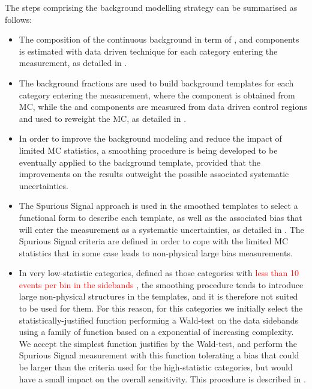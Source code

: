 The steps comprising the background modelling strategy can be summarised as follows:
\begin{itemize}

  \item The composition of the continuous background in term of \yy, \yjet and \jetjet components is estimated with data driven technique for each category entering the measurement, as detailed in \Sect{\ref{ssec:bkg_composition}}.
  \item The background fractions are used to build \myy background templates for each category entering the measurement, where the  \yy component is obtained from MC, while the  \yjet and \jetjet components are measured from data driven control regions and used to reweight the \yy MC, as detailed in \Sect{\ref{ssec:bkg_templates}}.

  \item In order to improve the background modeling and reduce the impact of limited MC statistics, a smoothing procedure is being developed to be eventually applied to the background template, provided that the improvements on the results outweight the possible associated systematic uncertainties. 

  \item The Spurious Signal approach is used in the smoothed \yy templates to select a functional form to describe each template, as well as the associated bias that will enter the measurement as a systematic uncertainties, as detailed in \Sect{\ref{ssec:spurious_signal}}. The Spurious Signal criteria are defined in order to cope with the limited MC statistics that in some case leads to non-physical large bias measurements.

  \item In very low-statistic categories, defined as those categories with \textcolor{red}{less than 10 events per bin in the \myy sidebands} , the smoothing procedure tends to introduce large non-physical structures in the templates, and it is therefore not suited to be used for them. For this reason, for this categories we initially select the statistically-justified function performing a Wald-test on the data sidebands using a family of function based on a exponential of increasing complexity. We accept the simplest function justifies by the Wald-test, and perform the Spurious Signal measurement with this function tolerating a bias that could be larger than the criteria used for the high-statistic categories, but would have a small impact on the overall sensitivity. This procedure is described in \Sect{\ref{sssec:bkg_functions}}. 

\end{itemize}


